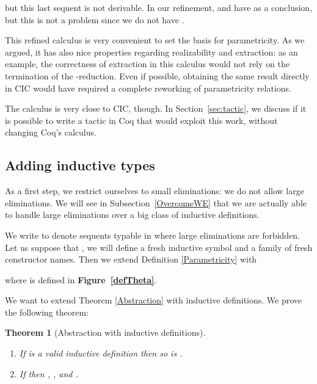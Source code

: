 \documentclass[a4paper,USenglish]{lipics}
\newtheorem{thm}{Theorem}
\def\coq{\textsf{Coq}\xspace}
\def\cic{\textsf{CIC}\xspace}
\def\cicr{\xspace}
\begin{document}
but this last sequent is not derivable. In our refinement,  and  have  as a conclusion,
but this is not a problem since we do not have .

This refined calculus is very convenient to set the basis for
parametricity. As we argued, it has also nice properties regarding
realizability and extraction: as an example, the correctness of
extraction in this calculus would not rely on the termination of the -reduction.
Even if possible, obtaining the same result directly in \cic would have
required a complete reworking of parametricity relations.

The calculus is very close to \cic, though. In Section~\ref{sec:tactic},
we discuss if it is possible to write a tactic in \coq that would
exploit this work, without changing \coq's calculus.


\subsection{Adding inductive types}

As a first step, we restrict ourselves to small eliminations: we do not
allow large eliminations. We will see in Subsection~\ref{OvercomeWE}
that we are actually able to handle large eliminations over a big
class of inductive definitions.

We write  to denote sequents typable in \cicr where large
eliminations are forbidden. Let us suppose that , we will define a fresh inductive symbol  and a
family  of fresh constructor names. Then we extend
\textsf{Definition \ref{Parametricity}} with
 
where  is defined in \textsf{\textbf{\small Figure~\ref{defTheta}}}.

\begin{figure*}

\caption{\label{defTheta} The definition of }
\end{figure*}

We want to extend \textsf{Theorem \ref{Abstraction}}
with inductive definitions. We prove the following theorem:

\begin{thm}[\label{AbstractionInductive}Abstraction with inductive definitions]
 \begin{enumerate}
  \item  If  is a valid inductive definition
       then so is .
  \item If  then , , and
      .
 \end{enumerate}
\end{thm}
\end{document}
